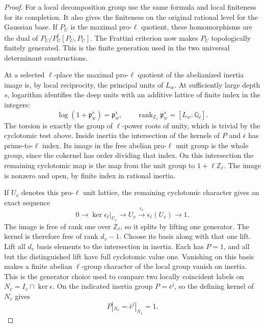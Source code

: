 \begin{proof}
For a
local decomposition group use the same formula and local
finiteness for its completion. It also gives the finiteness
on the original rational level for the Gaussian base. If \(P_U\)
is the maximal pro-\(\ell\) quotient, these homomorphisms are the
dual of \(P_U/\overline{P_U^\ell[P_U,P_U]}\). The Frattini
criterion now makes \(P_U\) topologically finitely generated. This is the finite generation used in
the two universal determinant constructions.
\cite{milne-duality,chenevier}\label{cor:ordinary-fitted-arithmetic-2}

At a selected \(\ell\)-place the maximal pro-\(\ell\) quotient
of the abelianized inertia image is, by local reciprocity,
the principal units of \(L_w\). At sufficiently large depth \(s\), logarithm identifies the deep units with an additive lattice of finite index in the integers:
\[
 \log(1+\mathfrak p_w^s)=\mathfrak p_w^s,\qquad \operatorname{rank}_{\mathbb Z_\ell}\mathfrak p_w^s=[L_w:\mathbb Q_\ell].
\]
The torsion is exactly the group of \(\ell\)-power roots of
unity, which is trivial by the cyclotomic test above.
Inside inertia the intersection of the kernels of \(P\) and
\(\bar\epsilon\) has prime-to-\(\ell\) index. Its image in
the free abelian pro-\(\ell\) unit group is the whole group,
since the cokernel has order dividing that index. On this
intersection the remaining cyclotomic map is the map
from the unit group to \(1+\ell\mathbb Z_\ell\). The image is
nonzero and open, by finite index in rational inertia.

If \(U_v\) denotes this pro-\(\ell\) unit lattice,
the remaining cyclotomic character gives an exact sequence
\[
 0\longrightarrow \ker\epsilon_\ell|_{U_v}
  \longrightarrow U_v\xrightarrow{\epsilon_\ell}
                   \epsilon_\ell(U_v)\longrightarrow1 .
\]
The image is free of rank one over \(\mathbb Z_\ell\),
so it splits by lifting one generator. The kernel is
therefore free of rank \(d_v-1\). Choose its basis along
with that one lift. Lift all \(d_v\) basis elements to the
intersection in inertia. Each has \(P=1\), and all but the
distinguished lift have full cyclotomic value one.
Vanishing on this basis makes a finite abelian
\(\ell\)-group character of the local group vanish on
inertia. This is the generator choice used to compare
two locally coincident labels on
\(N_v=I_v\cap\ker\epsilon\).
On the indicated inertia group \(P=\bar\epsilon^j\), so the defining kernel of \(N_v\) gives
\[
 P|_{N_v}=\bar\epsilon^j|_{N_v}=1 .
\]


\end{proof}
